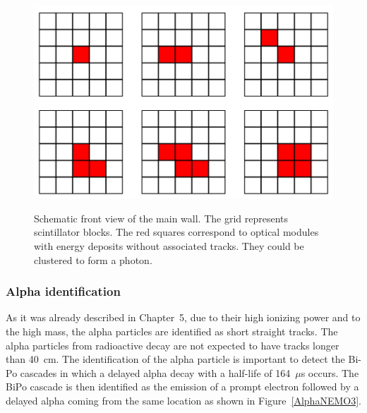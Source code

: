\documentclass[main.tex]{subfiles}
\begin{document}
\begin{figure}[h!]
\centering
\includegraphics[scale=0.20]{pictures/Chap6/GammaCluster.png}
\label{GammaClusterSchema}
\caption{Schematic front view of the main wall. The grid represents scintillator blocks. The red squares correspond to optical modules with energy deposits without associated tracks. They could be clustered to form a photon.}
\end{figure}

\FloatBarrier

\subsubsection{Alpha identification}


\NI As it was already described in Chapter~5, due to their high ionizing power and to the high mass, the alpha particles are identified as short straight tracks. The alpha particles from radioactive decay are not expected to have tracks longer than 40~cm. The identification of the alpha particle is important to detect the Bi-Po cascades in which a delayed alpha decay with a half-life of 164~$\mu$s occurs. The BiPo cascade is then identified as the emission of a prompt electron followed by a delayed alpha coming from the same location as shown in Figure~\ref{AlphaNEMO3}.  
\end{document}
